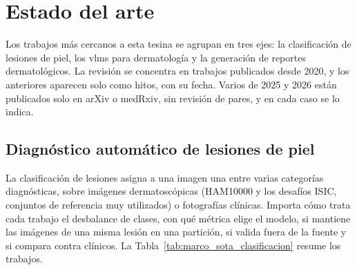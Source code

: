 \section{Estado del arte}
\label{sec:estado_arte}

Los trabajos más cercanos a esta tesina se agrupan en tres ejes: la clasificación de lesiones de piel, los
\glspl{vlm} para dermatología y la generación de reportes dermatológicos. La revisión se concentra en trabajos
publicados desde 2020, y los anteriores aparecen solo como hitos, con su fecha. Varios de 2025 y 2026 están
publicados solo en arXiv o medRxiv, sin revisión de pares, y en cada caso se lo indica.

\subsection{Diagnóstico automático de lesiones de piel}
\label{sec:estado_arte_diagnostico}

La clasificación de lesiones asigna a una imagen una entre varias categorías diagnósticas, sobre imágenes
dermatoscópicas (HAM10000 y los desafíos ISIC, conjuntos de referencia muy utilizados) o fotografías clínicas.
Importa cómo trata cada trabajo el desbalance de clases, con qué métrica elige el modelo, si mantiene las imágenes
de una misma lesión en una partición, si valida fuera de la fuente y si compara contra clínicos. La
Tabla~\ref{tab:marco_sota_clasificacion} resume los trabajos.

